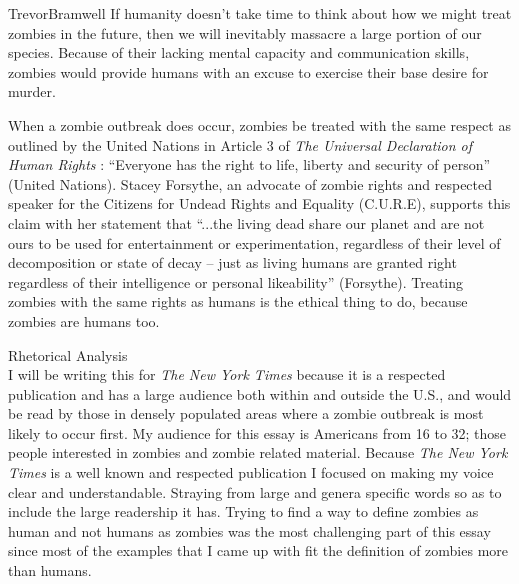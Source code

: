 \documentclass[12pt,letterpaper]{article}
\begin{document}
\begin{mla}{Trevor}{Bramwell}
If humanity doesn't take time to think about how we might treat zombies in the
future, then we will inevitably massacre a large portion of our species.
Because of their lacking mental capacity and communication skills, zombies
would provide humans with an excuse to exercise their base desire for murder.

\label{conclusion}
When a zombie outbreak does occur, zombies  be treated with the same respect
as outlined by the
United Nations in Article 3 of \emph{The Universal Declaration of Human Rights}
: ``Everyone has the right to life, liberty and security of person''
(United Nations).
Stacey Forsythe, an advocate of zombie rights and respected speaker for the
Citizens for Undead Rights and Equality (C.U.R.E), supports this claim with
her statement that 
``...the living dead share our planet and are not ours to be used for
entertainment or experimentation, regardless of their level of decomposition
or state of decay – just as living humans are granted right regardless of
their intelligence or personal likeability'' (Forsythe). Treating zombies with
the same rights as humans is the ethical thing to do, because zombies are
humans too.

\pagebreak
{\centering Rhetorical Analysis\\}
I will be writing this for \emph{The New York Times} because it is a respected
publication and has a large audience both within and outside the U.S., and
would be read by those in densely populated areas where a zombie outbreak is
most likely to occur first. My audience for this essay is Americans from 16 to
32; those people interested in zombies and zombie related material. Because
\emph{The New York Times} is a well known and respected publication I focused
on making my voice clear and understandable. Straying from large and
genera specific words so as to include the large readership it has.
Trying to find a way to define zombies as human and not humans as zombies
was the most challenging part of this essay since most of the examples that
I came up with fit the definition of zombies more than humans.



\end{mla}
\end{document}
